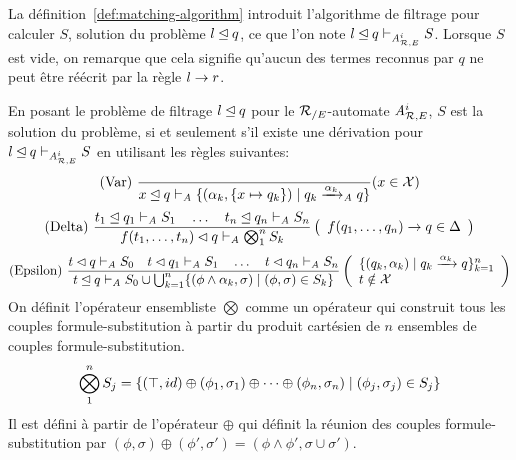 La définition~\ref{def:matching-algorithm} introduit l'algorithme de filtrage pour calculer $S$, solution du problème $l \unlhd q$,
ce que l'on note $l \unlhd q \vdash_{{\mathit A}_{\mathcal R,E}^i} S$. Lorsque $S$ est vide, on remarque que cela signifie 
qu'aucun des termes reconnus par $q$ ne peut être réécrit par la règle $l \rightarrow r$.


\begin{definition}
  \label{def:matching-algorithm}
  En posant le problème de filtrage $l \unlhd q$ pour le ${\mathcal R_{/E}}$-automate ${\mathit A}_{\mathcal R,E}^i$,
  $S$ est la solution du problème, si et seulement s'il existe une dérivation pour 
  $l \unlhd q \vdash_{{\mathit A}_{\mathcal R,E}^i} S$ en utilisant les règles suivantes:
  {\footnotesize
    \[\textrm{(Var) }
    \dfrac{}
    {x \unlhd q \vdash_\mathit A \{(\alpha_k, \{x \mapsto q_k\}) \; | \; q_k \xrightarrow{\alpha_k}_\mathit A q\}}
    (x \in \mathcal X)
    \]
    \[\textrm{(Delta) }
    \dfrac{
      t_1 \unlhd q_1 \vdash_\mathit A S_1
      \quad \dots \quad
      t_n \unlhd q_n \vdash_\mathit A S_n
    }{f(t_1, \dots, t_n) \lhd q \vdash_\mathit A \bigotimes_1^n S_k
    }\left(
      \begin{array}{l}
        f(q_1, \dots, q_n) \rightarrow q \in \Delta\\
      \end{array}
    \right )
    \]
    \[\textrm{(Epsilon) }
    \dfrac{ 
      t \matchi q    \vdash_\A S_0   \quad
      t \matchi q_1 \vdash_\A S_1 \quad \dots \quad
      t \matchi q_n \vdash_\A S_n
    }{
      t \match q \vdash_\A S_0 \cup
      \bigcup_{k=1}^n \{(\phi \land \alpha_k, \sigma) \sep (\phi, \sigma) \in S_k\}
    }\left(
      \begin{array}{l}
        \{(q_k, \alpha_k) \sep q_k \xrw{\alpha_k} q\}_{k=1}^n\\%
        t \notin \X\\
      \end{array}
    \right)
    \]
  }
  On définit l'opérateur ensembliste $\bigotimes$ comme un opérateur qui
  construit tous les couples formule-substitution à partir du produit cartésien
  de $n$ ensembles de couples formule-substitution.
  \[\bigotimes_1^n S_j = \{ (\top, id) \oplus (\phi_1, \sigma_1) \oplus \dots \oplus (\phi_n, \sigma_n) \; | \; (\phi_j,\sigma_j) \in S_j\}\]
  Il est défini à partir de l'opérateur $\oplus$ qui définit la réunion des couples formule-substitution par
  $(\phi, \sigma) \oplus (\phi', \sigma') = (\phi \land \phi',\sigma \cup \sigma')$.
\end{definition}
